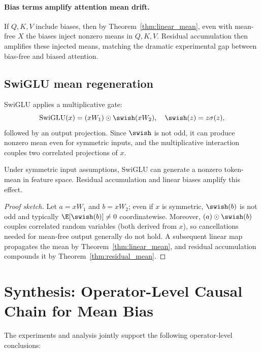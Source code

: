 \paragraph{Bias terms amplify attention mean drift.}
If $Q,K,V$ include biases, then by Theorem~\ref{thm:linear_mean}, even with mean-free $X$ the biases inject nonzero means in $Q,K,V$.
Residual accumulation then amplifies these injected means, matching the dramatic experimental gap between bias-free and biased attention.

\subsection{SwiGLU mean regeneration}

SwiGLU applies a multiplicative gate:
\[
\mathrm{SwiGLU}(x) = (xW_1)\odot \swish(xW_2),
\quad \swish(z)=z\sigma(z),
\]
followed by an output projection.
Since $\swish$ is not odd, it can produce nonzero mean even for symmetric inputs, and the multiplicative interaction couples two correlated projections of $x$.

\begin{proposition}
\label{prop:swiglu_mean}
Under symmetric input assumptions, SwiGLU can generate a nonzero token-mean in feature space.
Residual accumulation and linear biases amplify this effect.
\end{proposition}

\begin{proof}[Proof sketch]
Let $a=xW_1$ and $b=xW_2$; even if $x$ is symmetric, $\swish(b)$ is not odd and typically $\E[\swish(b)]\neq 0$ coordinatewise.
Moreover, $(a)\odot \swish(b)$ couples correlated random variables (both derived from $x$), so cancellations needed for mean-free output generally do not hold.
A subsequent linear map propagates the mean by Theorem~\ref{thm:linear_mean}, and residual accumulation compounds it by Theorem~\ref{thm:residual_mean}.
\end{proof}

\section{Synthesis: Operator-Level Causal Chain for Mean Bias}

The experiments and analysis jointly support the following operator-level conclusions:

